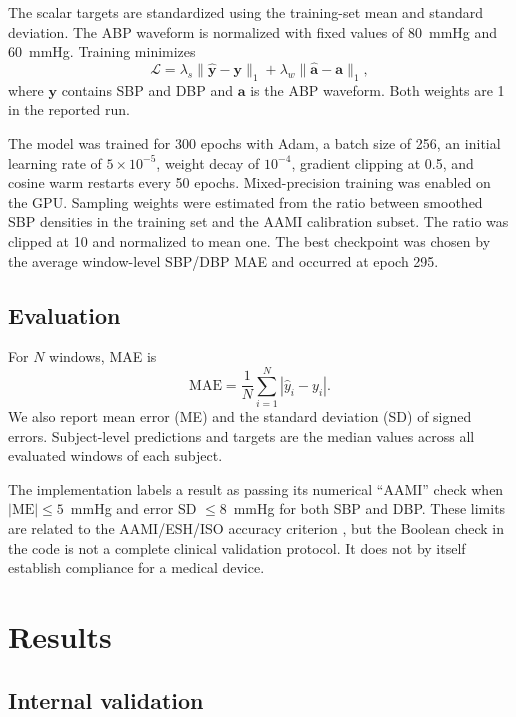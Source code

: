 \documentclass[journal,twoside,web]{ieeecolor}
\begin{document}
The scalar targets are standardized using the training-set mean and standard deviation. The ABP waveform is normalized with fixed values of 80~mmHg and 60~mmHg. Training minimizes
\begin{equation}
\mathcal{L}=\lambda_s\|\widehat{\mathbf{y}}-\mathbf{y}\|_1+
\lambda_w\|\widehat{\mathbf{a}}-\mathbf{a}\|_1,
\label{eq:loss}
\end{equation}
where $\mathbf{y}$ contains SBP and DBP and $\mathbf{a}$ is the ABP waveform. Both weights are 1 in the reported run.

The model was trained for 300 epochs with Adam, a batch size of 256, an initial learning rate of $5\times10^{-5}$, weight decay of $10^{-4}$, gradient clipping at 0.5, and cosine warm restarts every 50 epochs. Mixed-precision training was enabled on the GPU. Sampling weights were estimated from the ratio between smoothed SBP densities in the training set and the AAMI calibration subset. The ratio was clipped at 10 and normalized to mean one. The best checkpoint was chosen by the average window-level SBP/DBP MAE and occurred at epoch 295.

\subsection{Evaluation}

For $N$ windows, MAE is
\begin{equation}
\mathrm{MAE}=\frac{1}{N}\sum_{i=1}^{N}|\widehat{y}_i-y_i|.
\end{equation}
We also report mean error (ME) and the standard deviation (SD) of signed errors. Subject-level predictions and targets are the median values across all evaluated windows of each subject.

The implementation labels a result as passing its numerical ``AAMI'' check when $|\mathrm{ME}|\leq5$~mmHg and error SD $\leq8$~mmHg for both SBP and DBP. These limits are related to the AAMI/ESH/ISO accuracy criterion \cite{stergiou2018universal}, but the Boolean check in the code is not a complete clinical validation protocol. It does not by itself establish compliance for a medical device.

\section{Results}\label{sec:results}

\subsection{Internal validation}
\end{document}
